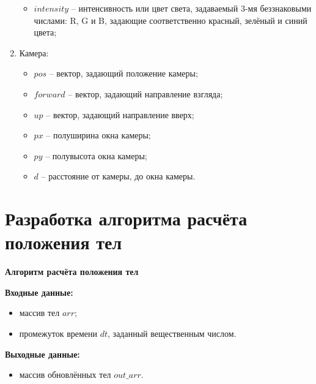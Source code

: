 \begin{enumerate}
\begin{itemize}
		\item $intensity$ -- интенсивность или цвет света, задаваемый 3-мя беззнаковыми числами: R, G и B, задающие соответственно красный, зелёный и синий цвета;
	\end{itemize}
	\item Камера:
	\begin{itemize}
		\item $pos$ -- вектор, задающий положение камеры;
		\item $forward$ -- вектор, задающий направление взгляда;
		\item $up$ -- вектор, задающий направление вверх;
		\item $px$ -- полуширина окна камеры;
		\item $py$ -- полувысота окна камеры;
		\item $d$ -- расстояние от камеры, до окна камеры.
	\end{itemize}
\end{enumerate}


\section{Разработка алгоритма расчёта положения тел}

\textbf{Алгоритм расчёта положения тел}

\textbf{Входные данные:}
\begin{itemize}
	\item массив тел $arr$;
	\item промежуток времени $dt$, заданный вещественным числом.
\end{itemize}

\textbf{Выходные данные:}
\begin{itemize}
	\item массив обновлённых тел $out\_arr$.
\end{itemize}


